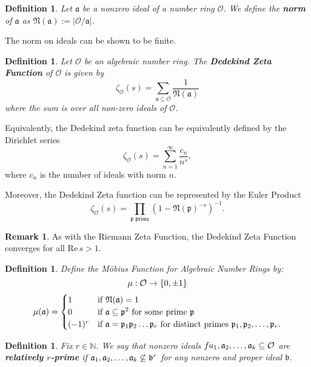 \documentclass[12pt]{amsart}
\newtheorem{definition}[theorem]{Definition}
\theoremstyle{definition}
\newtheorem*{remark}{Remark}
\newcommand{\f}[1]{\mathfrak{#1}}
\begin{document}
\begin{definition} \label{ideal-norm}
	Let $\mathfrak{a}$ be a nonzero ideal of a number ring $\mathcal{O}$. We
	define the \textbf{norm} of \(\f{a}\) as \(\f{N(a)}:=|\mathcal{O}/\f{a}|\).
\end{definition}

The norm on ideals can be shown to be finite. \cite{Marcus} 

\begin{definition} Let \(\mathcal{O}\) be an algebraic number ring. The \textbf{Dedekind Zeta Function} of \(\mathcal{O}\) is given by \begin{equation}
		\zeta_\mathcal{O}(s)=\sum_{\f{a\subseteq \mathcal{O}}}\frac{1}{\f{N(a)}}
	\end{equation} where the sum is over all non-zero ideals of \(\mathcal{O}\).
\end{definition}

Equivalently, the Dedekind zeta function can be equivalently defined by the Dirichlet series
$$\zeta_\mathcal{O}(s)=\sum_{n=1}^{\infty}\frac{c_n}{n^s},$$
where \(c_n\) is the number of ideals with norm \(n\).

Moreover, the Dedekind Zeta function can be represented by the Euler Product
$$\zeta_{\mathcal{O}}(s)=\prod_{\f{p \text{ prime}}}(1-\f{N(p)}^{-s})^{-1}.$$

\begin{remark}
	As with the Riemann Zeta Function, the Dedekind Zeta Function converges for all \(\text{Re} \, s>1\).
\end{remark}

\begin{definition} Define the M\"obius Function for Algebraic Number Rings by: 
	\begin{equation*}
		\mu:\mathcal{O}\to \{0,\pm 1\} \notag
	\end{equation*}
	\begin{equation*}
		\mu(\f{a})=\begin{cases}
			1 & \text{if \(\f{\mathfrak{N}(a)}=1\)}\\
			0 & \text{if \(\f{a\subseteq \f{p}}^2\) for some prime \(\f{p}\) }\\
			(-1)^r & \text{if \(\f{a}=\f{p}_1 \f{p}_2\mathellipsis\f{p}_r\) for distinct primes \( \f{p}_1,\f{p}_2,\mathellipsis, \f{p}_r\)}.
		\end{cases}
	\end{equation*}
\end{definition}

\begin{definition} Fix $r \in \mathbb{N}$. We say that nonzero ideals \(f{a}_1,\f{a}_2,\mathellipsis,\f{a}_k \subseteq \mathcal{O}\)  are \textbf{relatively \(r\)-prime} if \(\f{a}_1,\f{a}_2,\mathellipsis,\f{a}_k\not\subseteq \f{b}^r\) for any nonzero and proper ideal \(\f{b}\).
\end{definition}
\end{document}
